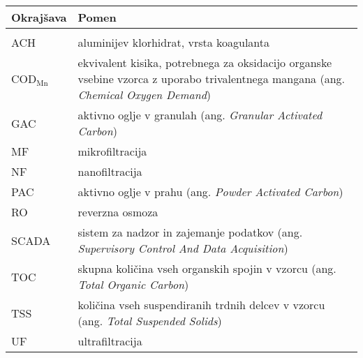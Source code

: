 \begin{longtable}[l]{@{}p{}@{}p{}@{}}
\hline
Okrajšava & Pomen\\
\hline
\endfirsthead
\hline
\endhead
&\\
ACH & aluminijev klorhidrat, vrsta koagulanta\\
COD$_{\text{Mn}}$ & ekvivalent kisika, potrebnega za oksidacijo organske vsebine vzorca z uporabo trivalentnega mangana (ang. \emph{Chemical Oxygen Demand})\\
GAC & aktivno oglje v granulah (ang. \emph{Granular Activated Carbon})\\
MF & mikrofiltracija\\
NF & nanofiltracija\\
PAC & aktivno oglje v prahu (ang. \emph{Powder Activated Carbon})\\
RO & reverzna osmoza\\
SCADA & sistem za nadzor in zajemanje podatkov (ang. \emph{Supervisory Control And Data Acquisition})\\
TOC & skupna količina vseh organskih spojin v vzorcu (ang. \emph{Total Organic Carbon})\\
TSS & količina vseh suspendiranih trdnih delcev v vzorcu (ang. \emph{Total Suspended Solids})\\
UF & ultrafiltracija\\
\end{longtable}

\newpage
